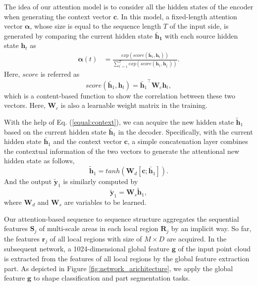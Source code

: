 \documentclass[letterpaper]{article}
\begin{document}
The idea of our attention model is to consider all the hidden states of the encoder when generating the context vector $\mathbf{c}$.
In this model, a fixed-length attention vector $\bm{\alpha}$, whose size is equal to the sequence length $T$ of the input side, is generated by comparing the current hidden state $\mathbf{\bar{h}_1}$ with each source hidden state $\mathbf{h}_t$ as
\begin{equation}
\begin{aligned}
\bm{\alpha}(t) &= \frac{exp(score(\mathbf{\bar{h}}_1, \mathbf{h}_t))}{{\sum}^T_{t^{'}=1}{exp(score(\mathbf{\bar{h}}_1, \mathbf{h}_{t^{'}}))}}.
\end{aligned}
\end{equation}
Here, $score$ is referred as 
\begin{equation}
score(\mathbf{\bar{h}}_1, \mathbf{h}_t) = {\mathbf{\bar{h}}_1}^{\top} \mathbf{W}_c \mathbf{h}_t,
\end{equation}
which is a content-based function to show the correlation between these two vectors. Here, $\mathbf{W}_c$ is also a learnable weight matrix in the training. 

With the help of Eq. (\ref{equal:context}), we can acquire the new hidden state $\mathbf{\tilde{h}}_1$ based on the current hidden state $\mathbf{\bar{h}}_1$ in the decoder.
Specifically, with the current hidden state $\mathbf{\bar{h}}_1$ and the context vector $\mathbf{c}$, a simple concatenation layer combines the  contextual information of the two vectors to generate the attentional new hidden state as follows,
\begin{equation}
\mathbf{\tilde{h}}_1 = tanh(\mathbf{W}_d[\mathbf{c}; \mathbf{\bar{h}}_1]).
\end{equation}
And the output $\mathbf{\tilde{y}}_1$ is similarly computed by
\begin{equation}
\mathbf{\tilde{y}}_1 = \mathbf{W}_s\mathbf{\tilde{h}}_1,
\end{equation}
where $\mathbf{W}_d$ and $\mathbf{W}_s$ are variables to be learned.

Our attention-based sequence to sequence structure aggregates the sequential features $\bm{S}_j$ of multi-scale areas in each local region $\bm{R}_j$ by an implicit way. So far, the features $\bm{r}_j$ of all local regions with size of $M \times D$ are acquired. 
In the subsequent network, a 1024-dimensional global feature $\bm{g}$ of the input point cloud is extracted from the features of all local regions by the global feature extraction part.
As depicted in Figure \ref{fig:network_arichitecture}, we apply the global feature $\bm{g}$ to shape classification and part segmentation tasks. 
\end{document}
